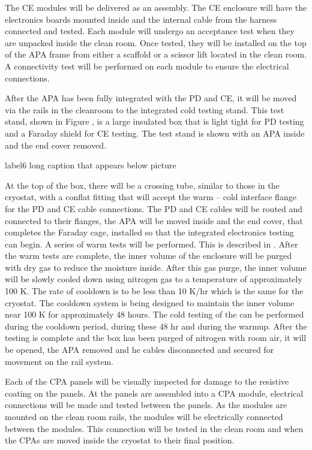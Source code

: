 The CE modules will be delivered as an assembly.  The CE enclosure will have the electronics boards mounted inside and the internal cable from the harness connected and tested.  Each module will undergo an acceptance test when they are unpacked inside the clean room.  Once tested, they will be installed on the top of the APA frame from either a scaffold or a scissor lift located in the clean room.  A connectivity test will be performed on each module to ensure the electrical connections.  

After the APA has been fully integrated with the PD and CE, it will be moved via the rails in the cleanroom to the integrated cold testing stand.  This test stand, shown in Figure , is a large insulated box that is light tight for PD testing and a Faraday shield for CE testing.  The test stand is shown with an APA inside and the end cover removed.  
%
\begin{cdrfigure}{label}{6 long caption that appears below picture}
\end{cdrfigure}
%
At the top of the box, there will be a crossing tube, similar to those in the cryostat, with a conflat fitting that will accept the warm – cold interface flange for the PD and CE cable connections.  The PD and CE cables will be routed and connected to their flanges, the APA will be moved inside and the end cover, that completes the Faraday cage, installed so that the integrated electronics testing can begin.  A series of warm tests will be performed.  This is described in .  After the warm tests are complete, the inner volume of the enclosure will be purged with dry gas to reduce the moisture inside.  After this gas purge, the inner volume will be slowly cooled down using nitrogen gas to a temperature of approximately 100 K.  The rate of cooldown is to be less than 10 K/hr which is the same for the cryostat.  The cooldown system is being designed to maintain the inner volume near 100 K for approximately 48 hours.  The cold testing of the can be performed during the cooldown period, during these 48 hr and during the warmup.  After the testing is complete and the box has been purged of nitrogen with room air, it will be opened, the APA removed and he cables disconnected and secured for movement on the rail system.   

Each of the CPA panels will be visually inspected for damage to the resistive coating on the panels.  At the panels are assembled into a CPA module, electrical connections will be made and tested between the panels.  As the modules are mounted on the clean room rails, the modules will be electrically connected between the modules.  This connection will be tested in the clean room and when the CPAs are moved inside the cryostat to their final position.  

